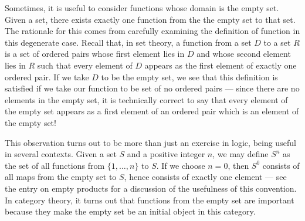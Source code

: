 \documentclass[12pt]{article}
\begin{document}
Sometimes, it is useful to consider functions whose domain is the 
empty set.  Given a set, there exists exactly one function from 
the the empty set to that set.  The rationale for this comes from 
carefully examining the definition of function in this degenerate 
case.  Recall that, in set theory, a function from a set $D$ to a 
set $R$ is a set of ordered pairs whose first element lies in $D$ 
and whose second element lies in $R$ such that every element of $D$
appears as the first element of exactly one ordered pair.  If we 
take $D$ to be the empty set, we see that this definition is satisfied
if we take our function to be set of no ordered pairs --- since there
are no elements in the empty set, it is technically correct to say
that every element of the empty set appears as a first element of
an ordered pair which is an element of the empty set!

This observation turns out to be more than just an exercise in 
logic, being useful in several contexts.  Given a set $S$ and a positive
integer $n$, we may define $S^n$ as the set of all functions from 
$\{1, \ldots, n\}$ to $S$.   If we choose $n=0$, then $S^0$ consists
of all maps from the empty set to $S$, hence consists of exactly one
element --- see the entry on empty products for a discussion of the
usefulness of this convention.  In category theory, it turns out that 
functions from the empty set are important because they make the empty 
set be an initial object in this category.

\end{document}

